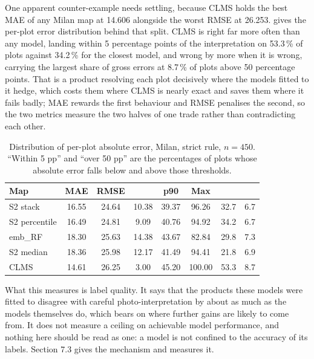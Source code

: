 \documentclass[11pt,a4paper]{article}
\begin{document}
One apparent counter-example needs settling, because CLMS holds the best MAE of
any Milan map at 14.606 alongside the worst RMSE at 26.253.
 gives the per-plot error distribution behind that
split. CLMS is right far more often than any model, landing within 5 percentage
points of the interpretation on 53.3\,\% of plots against 34.2\,\% for the closest
model, and wrong by more when it is wrong, carrying the largest share of gross
errors at 8.7\,\% of plots above 50 percentage points. That is a product resolving
each plot decisively where the models fitted to it hedge, which costs them where
CLMS is nearly exact and saves them where it fails badly; MAE rewards the first
behaviour and RMSE penalises the second, so the two metrics measure the two
halves of one trade rather than contradicting each other.

\begin{table}[htbp]
  \centering
  \caption{Distribution of per-plot absolute error, Milan, strict rule,
  $n = 450$. ``Within 5 pp'' and ``over 50 pp'' are the percentages of plots whose
  absolute error falls below and above those thresholds.}
  \label{tab:milan-error-dist}
  \setlength{\tabcolsep}{4pt}
  \begin{tabular}{l S[table-format=2.2] S[table-format=2.2] S[table-format=2.2] S[table-format=2.2] S[table-format=3.2] S[table-format=2.1] S[table-format=1.1]}
    \toprule
    {Map} & {MAE} & {RMSE} & {} & {p90} & {Max} & {} & {} \\
    \midrule
    S2 stack      & 16.55 & 24.64 & 10.38 & 39.37 & 96.26  & 32.7 & 6.7 \\
    S2 percentile & 16.49 & 24.81 & 9.09  & 40.76 & 94.92  & 34.2 & 6.7 \\
    emb\_RF       & 18.30 & 25.63 & 14.38 & 43.67 & 82.84  & 29.8 & 7.3 \\
    S2 median     & 18.36 & 25.98 & 12.17 & 41.49 & 94.41  & 21.8 & 6.9 \\
    CLMS          & 14.61 & 26.25 & 3.00  & 45.20 & 100.00 & 53.3 & 8.7 \\
    \bottomrule
  \end{tabular}
\end{table}

What this measures is label quality. It says that the products these models were
fitted to disagree with careful photo-interpretation by about as much as the
models themselves do, which bears on where further gains are likely to come
from. It does not measure a ceiling on achievable model performance, and nothing
here should be read as one: a model is not confined to the accuracy of its
labels. Section 7.3 gives the mechanism and measures it.
\end{document}
